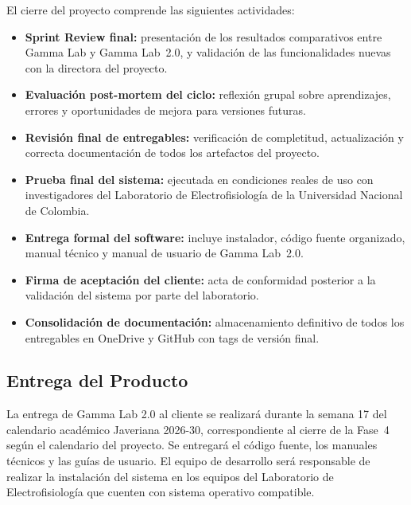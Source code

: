 \documentclass{article}
\begin{document}
El cierre del proyecto comprende las siguientes actividades:

\begin{itemize}
    \item \textbf{Sprint Review final:} presentación de los resultados
    comparativos entre Gamma Lab y Gamma Lab~2.0, y validación de las
    funcionalidades nuevas con la directora del proyecto.

    \item \textbf{Evaluación post-mortem del ciclo:} reflexión grupal sobre
    aprendizajes, errores y oportunidades de mejora para versiones futuras.

    \item \textbf{Revisión final de entregables:} verificación de
    completitud, actualización y correcta documentación de todos los
    artefactos del proyecto.

    \item \textbf{Prueba final del sistema:} ejecutada en condiciones reales
    de uso con investigadores del Laboratorio de Electrofisiología de la
    Universidad Nacional de Colombia.

    \item \textbf{Entrega formal del software:} incluye instalador, código
    fuente organizado, manual técnico y manual de usuario de Gamma Lab~2.0.

    \item \textbf{Firma de aceptación del cliente:} acta de conformidad
    posterior a la validación del sistema por parte del laboratorio.

    \item \textbf{Consolidación de documentación:} almacenamiento definitivo
    de todos los entregables en OneDrive y GitHub con tags de versión final.
\end{itemize}

\subsection{Entrega del Producto}

La entrega de Gamma Lab 2.0 al cliente se realizará durante la semana 17 del calendario
académico Javeriana 2026-30, correspondiente al cierre de la Fase~4 según el
calendario del proyecto. Se entregará el código fuente, los manuales
técnicos y las guías de usuario. El equipo de desarrollo será responsable
de realizar la instalación del sistema en los equipos del Laboratorio de
Electrofisiología que cuenten con sistema operativo compatible.
\end{document}

